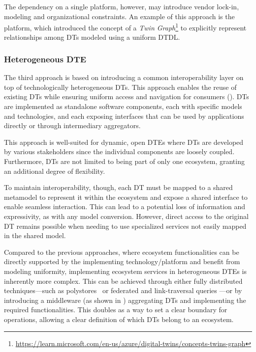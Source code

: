 The dependency on a single platform, however, may introduce vendor lock-in, modeling and organizational constraints.
%
An example of this approach is the \azureTwin{} platform, which introduced the concept of a \emph{Twin Graph}\footnote{\url{https://learn.microsoft.com/en-us/azure/digital-twins/concepts-twins-graph}}
to explicitly represent relationships among \acp{DT} modeled using a uniform \ac{DTDL}.


\subsubsection{Heterogeneous \ac{DTE}}
\label{sssec:heterogeneous}

The third approach is based on introducing a common interoperability layer on top of technologically heterogeneous \acp{DT}.
%
This approach enables the reuse of existing \acp{DT} while ensuring uniform access and navigation for consumers ().
%
\acp{DT} are implemented as standalone software components, each with specific models and technologies, and each exposing interfaces that can be used by applications directly or through intermediary aggregators.

This approach is well-suited for dynamic, open \acp{DTE} where \acp{DT} are developed by various stakeholders since the individual components are loosely coupled.
%
Furthermore, \acp{DT} are not limited to being part of only one ecosystem, granting an additional degree of flexibility.

To maintain interoperability, though, each \ac{DT} must be mapped to a shared metamodel to represent it within the ecosystem and expose a shared interface to enable seamless interaction.
This can lead to a potential loss of information and expressivity, as with any model conversion.
However, direct access to the original \ac{DT} remains possible when needing to use specialized services not easily mapped in the shared model.

Compared to the previous approaches, where ecosystem functionalities can be directly supported by the implementing technology/platform and benefit from modeling uniformity, implementing ecosystem services in heterogeneous \acp{DTE} is inherently more complex.
%
This can be achieved through either fully distributed techniques---such as polystores~\cite{dggan2015polystore} or federated and link-traversal queries \cite{schwarte2011semweb,quilitz2008querydistributed,bogaerts2021linktraversalquery}---or by introducing a middleware (as shown in ) aggregating \acp{DT} and implementing the required functionalities.
%
This doubles as a way to set a clear boundary for operations, allowing a clear definition of which \acp{DT} belong to an ecosystem.


